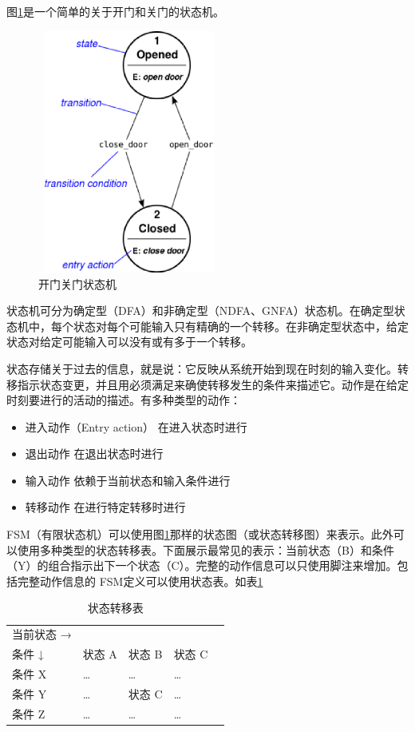\documentclass[12pt, twoside, a4paper, xetex]{report}
\begin{document}
	图\ref{fsm}是一个简单的关于开门和关门的状态机。
	
	\begin{figure}[htbp]
	\centering
	\caption{开门关门状态机}
	\label{fsm}
	\includegraphics[height=8cm, width=6cm]{pics/fsm.eps}
	\end{figure}
	
	状态机可分为确定型（DFA）和非确定型（NDFA、GNFA）状态机。在确定型状态机中，每个状态对每个可能输入只有精确的一个转移。在非确定型状态中，给定状态对给定可能输入可以没有或有多于一个转移。
	
	状态存储关于过去的信息，就是说：它反映从系统开始到现在时刻的输入变化。转移指示状态变更，并且用必须满足来确使转移发生的条件来描述它。动作是在给定时刻要进行的活动的描述。有多种类型的动作：
	\begin{itemize}
		\item 进入动作（Entry action） 在进入状态时进行
		\item 退出动作 在退出状态时进行
		\item 输入动作 依赖于当前状态和输入条件进行
		\item 转移动作 在进行特定转移时进行
	\end{itemize}
	
	FSM（有限状态机）可以使用图\ref{fsm}那样的状态图（或状态转移图）来表示。此外可以使用多种类型的状态转移表。下面展示最常见的表示：当前状态（B）和条件（Y）的组合指示出下一个状态（C）。完整的动作信息可以只使用脚注来增加。包括完整动作信息的 FSM定义可以使用状态表。如表\ref{statemove}
	
\begin{table}[htbp]
\setlength{\abovecaptionskip}{0pt} 
\setlength{\belowcaptionskip}{10pt} 
\label{statemove}
\caption{状态转移表}
\centering
\begin{tabularx}{\textwidth}{XXXXl} %
\toprule
\centering 当前状态 →\\条件 ↓     &	 \centering  状态 A &\centering 	状态 B &\centering 	状态 C &\\
\midrule
\centering 条件 X &\centering 	… &\centering 	… &	\centering … &\\
\centering 条件 Y &\centering 	… &\centering 	状态 C &\centering 	…&\\
\centering 条件 Z &\centering 	… &\centering 	… &\centering 	… &\\
\bottomrule
\end{tabularx}
\end{table}
	
\end{document}
